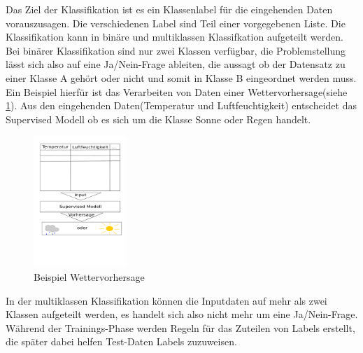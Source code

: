 	Das Ziel der Klassifikation ist es ein Klassenlabel für die eingehenden Daten vorauszusagen. Die verschiedenen Label sind Teil einer vorgegebenen Liste. \cite{Mueller2016} Die Klassifikation kann in binäre und multiklassen Klassifkation aufgeteilt werden. Bei binärer Klassifikation sind nur zwei Klassen verfügbar, die Problemstellung lässt sich also auf eine Ja/Nein-Frage ableiten, die aussagt ob der Datensatz zu einer Klasse A gehört oder nicht und somit in Klasse B eingeordnet werden muss. Ein Beispiel hierfür ist das Verarbeiten von Daten einer Wettervorhersage(siehe \ref{fig:abb1}). Aus den eingehenden Daten(Temperatur und Luftfeuchtigkeit) entscheidet das Supervised Modell ob es sich um die Klasse Sonne oder Regen handelt.  \cite{Mueller2016}\newline 
		\begin{figure}[H]
			\centering
			\includegraphics[width=3.5cm]{Bilder/Label.pdf}
			\caption{Beispiel Wettervorhersage}
			\label{fig:abb1}
		\end{figure}
		
	In der multiklassen Klassifikation können die Inputdaten auf mehr als zwei Klassen aufgeteilt werden, es handelt sich also nicht mehr um eine Ja/Nein-Frage. \cite{Mueller2016} Während der Trainings-Phase werden Regeln für das Zuteilen von Labels erstellt, die später dabei helfen Test-Daten Labels zuzuweisen.  \cite{Suthaharan2016}
	
